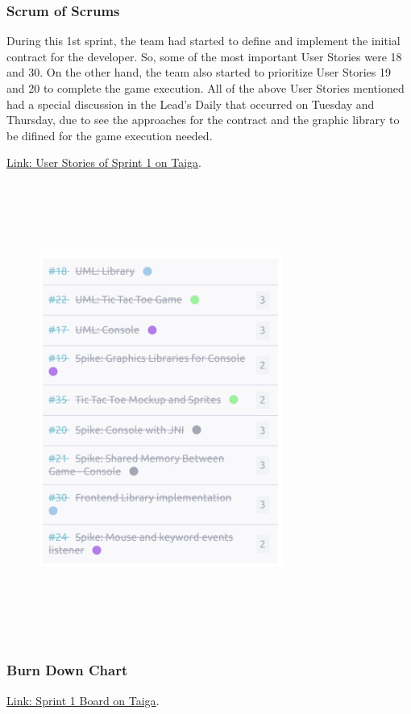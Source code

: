 \hypertarget{sos-s1} {
\subsubsection{Scrum of Scrums}\label{Scrum of Scrums} 
During this 1st sprint, the team had started to define and implement the initial contract 
for the developer. So, some of the most important User Stories were 18 and 30. On the other hand, 
the team also started to prioritize User Stories 19 and 20 to complete the game execution.
All of the above User Stories mentioned had a special discussion in the Lead's Daily that
occurred on Tuesday and Thursday, due to see the approaches for the contract 
and the graphic library to be difined for the game execution needed.
}

\href{https://tree.taiga.io/project/joseluis-teran-coffeetime/taskboard/sprint-1-9301}{Link: User Stories of Sprint 1 on Taiga}.

\begin{figure}
\centering
\includegraphics[width=8cm, height=15cm]{./artifacts/src/sprint-1/assets/us-s1.png}
\end{figure}

\hypertarget{burndownchart-s1}{
\subsubsection{Burn Down Chart}\label{Burn Down Chart S1}}
\href{https://tree.taiga.io/project/joseluis-teran-coffeetime/taskboard/sprint-1-9301}{Link: Sprint 1 Board on Taiga}.

